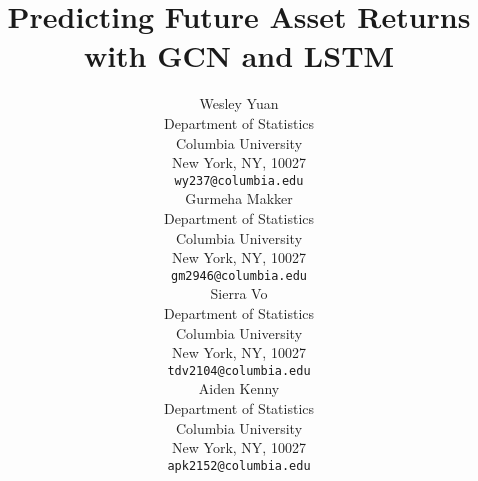 \title{Predicting Future Asset Returns with GCN and LSTM} %
\author{%
  Wesley Yuan \\
  Department of Statistics \\
  Columbia University \\
  New York, NY, 10027 \\
  \texttt{wy237@columbia.edu} \\
  \And
  Gurmeha Makker \\
  Department of Statistics \\
  Columbia University \\
  New York, NY, 10027 \\
  \texttt{gm2946@columbia.edu} \\
  \And
  Sierra Vo \\
  Department of Statistics \\
  Columbia University \\
  New York, NY, 10027 \\
  \texttt{tdv2104@columbia.edu} \\
  \And
  Aiden Kenny \\
  Department of Statistics \\
  Columbia University \\
  New York, NY, 10027 \\
  \texttt{apk2152@columbia.edu} \\
}

\maketitle